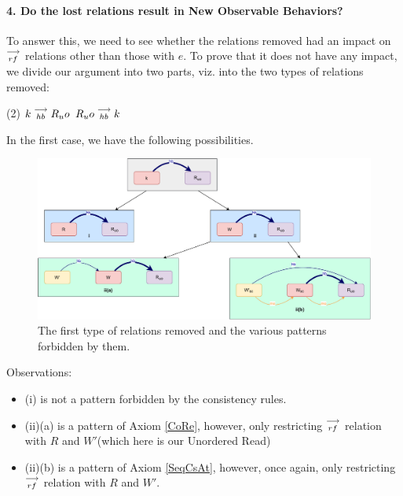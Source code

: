 \paragraph{4. Do the lost relations result in New Observable Behaviors?}

        To answer this, we need to see whether the relations removed had an impact on $\stackrel{\longrightarrow}{_{rf}}$ relations other than those with $e$. To prove that it does not have any impact, we divide our argument into two parts, viz. into the two types of relations removed:

        \begin{tasks}(2)
            \task $k\stackrel{\longrightarrow}{_{hb}}R_uo$ 
            \task $R_uo\stackrel{\longrightarrow}{_{hb}}k$ 
        \end{tasks}

        In the first case, we have the following possibilities. 
        \begin{figure}[H]
            \centering
            \includegraphics[scale=0.5]{6.Elimination/1.ValidEliminationCandidate/ReadElimProof/ProofParts/Part4_Case1.pdf}
            \caption{The first type of relations removed and the various patterns forbidden by them.}
        \end{figure}

        Observations:
        \begin{itemize}
            \item (i) is not a pattern forbidden by the consistency rules.
            \item (ii)(a) is a pattern of Axiom \ref{CoRe}, however, only restricting $\stackrel{\longrightarrow}{_{rf}}$ relation with $R$ and $W'$(which here is our Unordered Read)
            \item (ii)(b) is a pattern of Axiom \ref{SeqCsAt}, however, once again, only restricting $\stackrel{\longrightarrow}{_{rf}}$ relation with $R$ and $W'$. 
        \end{itemize}

